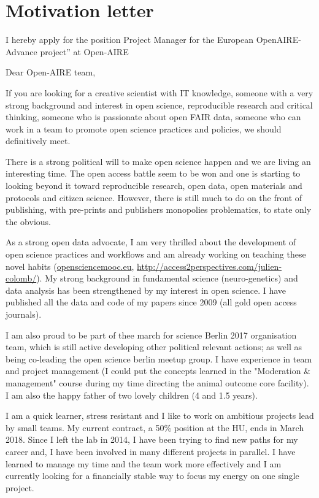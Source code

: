 \section* {Motivation letter}

I hereby apply for the position Project Manager for the European OpenAIRE-Advance project'' at Open-AIRE
\vspace {0.5cm} 

Dear Open-AIRE team,

If you are looking for a creative scientist with IT knowledge, someone with a very strong background and interest in open science, reproducible research and critical thinking, someone who is passionate about open FAIR data, someone who can work in a team to promote open science practices and policies, we should definitively meet.

There is a strong political will to make open science happen and we are living an interesting time. The open access battle seem to be won and one is starting to looking beyond it toward reproducible research, open data, open materials and protocols and citizen science. However, there is still much to do on the front of publishing, with pre-prints and publishers monopolies problematics, to state only the obvious.  

As a strong open data advocate, I am very thrilled about the development of open science practices and workflows and am already working on teaching these novel habits  (\url{opensciencemooc.eu},  \url{http://access2perspectives.com/julien-colomb/}). My strong background in fundamental science (neuro-genetics) and data analysis has been strengthened by my interest in open science. I have published all the data and code of my papers since 2009 (all gold open access journals).

 I am also proud to be part of thee march for science Berlin 2017 organisation team, which is still active developing other political relevant actions; as well as being co-leading the open science berlin meetup group.
I  have experience in team and project management (I could put the concepts learned in the "Moderation \& management" course during my time directing the animal outcome core facility).
 I am also the happy father of two lovely children (4 and 1.5 years).


I am  a quick learner, stress resistant and I like to work on ambitious projects lead by small teams. My current contract, a 50\% position at the HU, ends in March 2018. 
Since I left the lab in 2014, I have been trying to find new paths for my career and,
 I have been involved in many different projects in parallel. I have learned to manage my time and the team work more effectively and I am currently looking for a financially stable way to focus my energy on one single project. 

